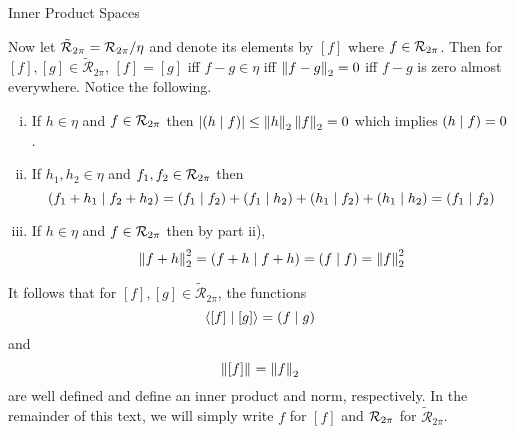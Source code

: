 \begin{section}{Inner Product Spaces}
\begin{ex}
	Now let $\tilde{\mathcal{R}}_{2\pi} = \riemmint/\eta$ and denote
	its elements by $[f]$ where $f \in \riemmint$. Then for $[f],[g]
	\in \tilde{\mathcal{R}}_{2\pi}$, $[f]=[g]$ iff $f-g \in \eta$ iff
	$\norm{f-g} = 0$ iff $f-g$ is zero almost everywhere. Notice the
	following.
		\begin{enumerate}[i)]
			\item
				If $h \in \eta$ and $f \in \riemmint$ then $\modulus
				{\innrprod{h}{f}} \leq \norm{h}\norm{f} = 0$ which
				implies $\innrprod{h}{f}=0$.
			\item
				If $h_1, h_2 \in \eta$ and $f_1, f_2 \in \riemmint$
				then
					\begin{displaymath}
						\innrprod{f_1+h_1}{f_2+h_2} = \innrprod{f_1}{f_2}
							+ \innrprod{f_1}{h_2} + \innrprod{h_1}{f_2}
							+ \innrprod{h_1}{h_2}
							= \innrprod{f_1}{f_2}
					\end{displaymath}
			\item
				If $h \in \eta$ and $f \in \riemmint$ then by
				part ii),
					\begin{displaymath}
						\norm{f+h}^2 = \innrprod{f+h}{f+h}
							= \innrprod{f}{f} = \norm{f}^2
					\end{displaymath}
		\end{enumerate}
	It follows that for $[f],[g] \in \tilde{\mathcal{R}}_{2\pi}$, 
	the functions
		\begin{displaymath}
			\innerprod{[f]}{[g]} = \innrprod{f}{g}
		\end{displaymath}
	and
		\begin{displaymath}
			\norm[]{[f]} = \norm{f}
		\end{displaymath}
	are well defined and define an inner product and norm,
	respectively. In the remainder of this text, we will simply
	write $f$ for $[f]$ and $\riemmint$ for
	$\tilde{\mathcal{R}}_{2\pi}$.
\end{ex}

\end{section}
